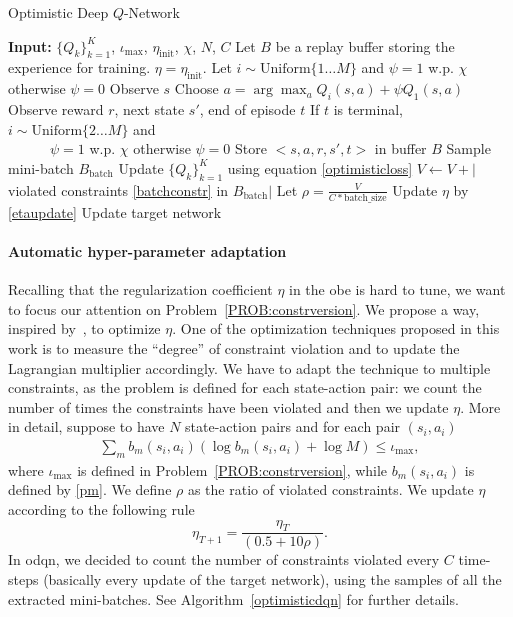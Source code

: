 \begin{algorithm}[t]
	\caption{Optimistic Deep $Q$-Network}
	\label{optimisticdqn}
	\begin{algorithmic}
		\STATE \textbf{Input:} $\{Q_k\}_{k=1}^K$, $\iota_{\max}$, $\eta_{\mathrm{init}}$, $\chi$, $N$, $C$
		\STATE Let $B$ be a replay buffer storing the experience for training.
		\STATE $\eta = \eta_{\mathrm{init}}$.
		\STATE Let $i \sim \mathrm{Uniform}\{1 \dots M\}$ and $\psi = 1$ w.p. $\chi$ otherwise $\psi = 0$
		\STATE Observe $s$
		\STATE Choose $a = \arg \max_a Q_i(s,a) + \psi Q_1(s,a)$
		\STATE Observe reward $r$, next state $s'$, end of episode $t$
		\STATE If $t$ is terminal, $i \sim \mathrm{Uniform}\{2 \dots M\}$ and \\ \ \ \ \ \ \ $\psi = 1$ w.p. $\chi$ otherwise $\psi=0$
		\STATE Store $<s,a,r,s',t>$ in buffer $B$
		\STATE Sample mini-batch $B_{\mathrm{batch}}$
		\STATE Update $\{Q_k\}_{k=1}^K$ using equation \eqref{optimisticloss}
		\STATE $V \leftarrow V + |$ violated constraints \eqref{batchconstr} in $B_{\mathrm{batch}}|$ 
		\ENDFOR
		\STATE Let $\rho = \frac{V}{C * \mathrm{batch\_size}}$
		\STATE Update $\eta$ by \eqref{etaupdate}
		\STATE Update target network
		\ENDFOR
	\end{algorithmic}
\end{algorithm}

\paragraph{Automatic hyper-parameter adaptation}
\label{subsec:adaptive}
Recalling that the regularization coefficient $\eta$ in the \gls{obe} is hard to tune, we want to focus our attention on Problem~\ref{PROB:constrversion}. We propose a way, inspired by~\cite{schulman2017proximal}, to optimize $\eta$.
One of the optimization techniques proposed in this work is to measure the ``degree'' of constraint violation and to update the Lagrangian multiplier accordingly. We have to adapt the technique to multiple constraints, as the problem is defined for each state-action pair: we count the number of times the constraints have been violated and then we update $\eta$. More in detail, suppose to have $N$ state-action pairs and for each pair $(s_i, a_i)$
\begin{eqnarray}
\sum_m b_m(s_i,a_i) (\log b_m(s_i,a_i) + \log M) \leq \iota_{\max}, \label{batchconstr}
\end{eqnarray}
where $\iota_{\max}$ is defined in Problem~\ref{PROB:constrversion}, while $b_m(s_i,a_i)$ is defined by \eqref{pm}. We define $\rho$ as the ratio of violated constraints. We update $\eta$ according to the following rule
\begin{equation}
\eta_{T+1} = \frac{\eta_{T}}{(0.5 +  10 \rho)} \label{etaupdate}.
\end{equation}
In \gls{odqn}, we decided to count the number of constraints violated every $C$ time-steps (basically every update of the target network), using the samples of all the extracted mini-batches. See Algorithm~\ref{optimisticdqn} for further details. 
  
